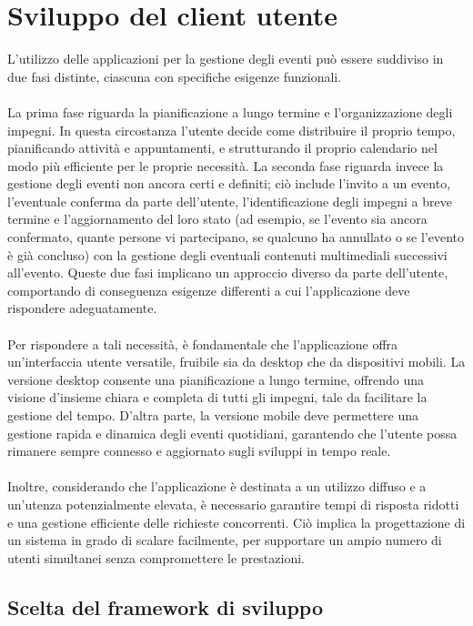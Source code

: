 \section{Sviluppo del client utente}
L'utilizzo delle applicazioni per la gestione degli eventi
può essere suddiviso in due fasi distinte,
ciascuna con specifiche esigenze funzionali.\\
\\
La prima fase riguarda la pianificazione a lungo termine e l'organizzazione degli impegni.
In questa circostanza l'utente decide come distribuire il proprio tempo, 
pianificando attività e appuntamenti,
e strutturando il proprio calendario nel modo più efficiente per le proprie necessità.
La seconda fase riguarda invece la gestione degli eventi non ancora certi e definiti;
ciò include l'invito a un evento, l'eventuale conferma da parte dell'utente,
l'identificazione degli impegni a breve termine e l'aggiornamento del loro stato
(ad esempio, se l'evento sia ancora confermato, quante persone vi partecipano,
se qualcuno ha annullato o se l'evento è già concluso)
con la gestione degli eventuali contenuti multimediali successivi all'evento.
Queste due fasi implicano un approccio diverso da parte dell'utente,
comportando di conseguenza esigenze differenti
a cui l'applicazione deve rispondere adeguatamente.\\
\\
Per rispondere a tali necessità, 
è fondamentale che l'applicazione offra un'interfaccia utente versatile,
fruibile sia da desktop che da dispositivi mobili.
La versione desktop consente una pianificazione a lungo termine,
offrendo una visione d'insieme chiara e completa di tutti gli impegni,
tale da facilitare la gestione del tempo.
D'altra parte, la versione mobile deve permettere una gestione rapida e dinamica degli eventi quotidiani,
garantendo che l'utente possa rimanere sempre connesso e aggiornato sugli sviluppi in tempo reale.\\
\\
Inoltre, considerando che l'applicazione è destinata
a un utilizzo diffuso e a un'utenza potenzialmente elevata,
è necessario garantire tempi di risposta ridotti e 
una gestione efficiente delle richieste concorrenti.
Ciò implica la progettazione di un sistema in grado di scalare facilmente,
per supportare un ampio numero di utenti simultanei senza compromettere le prestazioni.
\clearpage
\subsection{Scelta del framework di sviluppo}

